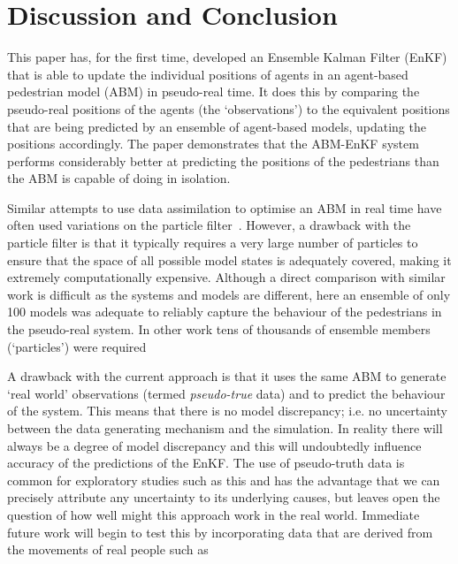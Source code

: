 \documentclass{article}
\begin{document}
\section{Discussion and Conclusion}\label{sec:conc}

This paper has, for the first time, developed an Ensemble Kalman Filter (EnKF) that is able to update the individual positions of agents in an agent-based pedestrian model (ABM) in pseudo-real time. It does this by comparing the pseudo-real positions of the agents (the `observations') to the equivalent positions that are being predicted by an ensemble of agent-based models, updating the positions accordingly. The paper demonstrates that the ABM-EnKF system performs considerably better at predicting the positions of the pedestrians than the ABM is capable of doing in isolation. 

Similar attempts to use data assimilation to optimise an ABM in real time have often used variations on the particle filter~\citep{kieu_dealing_2020, wang_data_2015, malleson_simulating_2020, ternes_data_2021}. However, a drawback with the particle filter is that it typically requires a very large number of particles to ensure that the space of all possible model states is adequately covered, making it extremely computationally expensive. Although a direct comparison with similar work is difficult as the systems and models are different, here an ensemble of only 100 models was adequate to reliably capture the behaviour of the pedestrians in the pseudo-real system. In other work tens of thousands of ensemble members (`particles') were required~\citep{malleson_simulating_2020} 

A drawback with the current approach is that it uses the same ABM to generate `real world' observations (termed \textit{pseudo-true} data) and to predict the behaviour of the system. This means that there is no model discrepancy; i.e. no uncertainty between the data generating mechanism and the simulation. In reality there will always be a degree of model discrepancy and this will undoubtedly influence accuracy of the predictions of the EnKF. The use of pseudo-truth data is common for exploratory studies such as this \citep[see for example][]{wang_data_2015, malleson2020simulating} and has the advantage that we can precisely attribute any uncertainty to its underlying causes, but leaves open the question of how well might this approach work in the real world. Immediate future work will begin to test this by incorporating data that are derived from the movements of real people such as \citet{zhou_understanding_2012}
\end{document}
